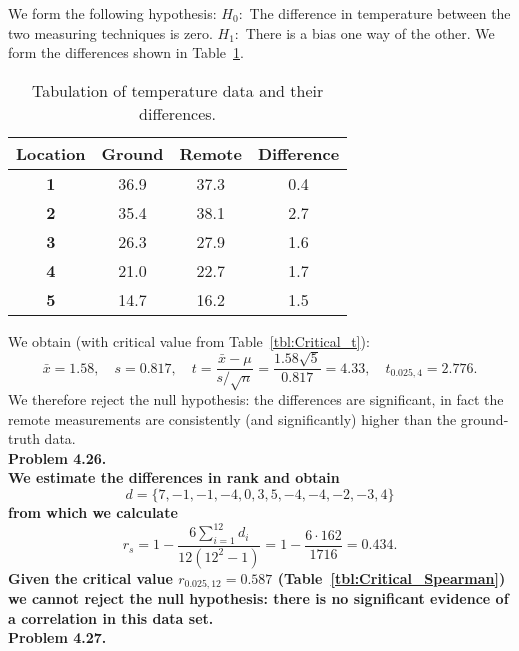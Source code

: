 We form the following hypothesis: $H_0:$ The difference in temperature between the two
measuring techniques is zero. $H_1:$ There is a bias one way of the other.  We form the
differences shown in Table~\ref{tbl:tmpdiffs}.
\begin{table}[H]
\centering
\begin{tabular}{|c|c|c|c|} \hline
\bf{Location} & \bf{Ground} & \bf{Remote} & \bf{Difference} \\ \hline
\bf{1} & 36.9 & 37.3 & 0.4 \\ \hline
\bf{2} & 35.4 & 38.1 & 2.7 \\ \hline
\bf{3} & 26.3 & 27.9 & 1.6 \\ \hline
\bf{4} & 21.0 & 22.7 & 1.7 \\ \hline
\bf{5} & 14.7 & 16.2 & 1.5 \\ \hline
\end{tabular}
\caption{Tabulation of temperature data and their differences.}
\label{tbl:tmpdiffs}
\end{table}
We obtain (with critical value from Table~\ref{tbl:Critical_t}):
$$\bar{x} = 1.58, \quad s = 0.817, \quad t = \frac{\bar{x} - \mu}{s/\sqrt{n}} = \frac{1.58\sqrt{5}}{0.817} = 4.33, \quad t_{0.025,4} = 2.776.
$$
We therefore reject the null hypothesis: the differences are significant, in fact the remote measurements
are consistently (and significantly) higher than the ground-truth data.
\\

\noindent
\bf{Problem 4.26.} \\

We estimate the differences in rank and obtain
\[
d = \{7, -1, -1, -4, 0, 3, 5, -4, -4, -2, -3, 4\}
\]
from which we calculate
\[
r_s = 1 - \frac{6\sum_{i=1}^{12} d_i}{12(12^2-1)} = 1 - \frac{6\cdot162}{1716} = 0.434.
\]
Given the critical value $r_{0.025,12} = 0.587$ (Table~\ref{tbl:Critical_Spearman}) we cannot reject the null hypothesis: there is
no significant evidence of a correlation in this data set.
\\

\noindent
\bf{Problem 4.27.} \\


